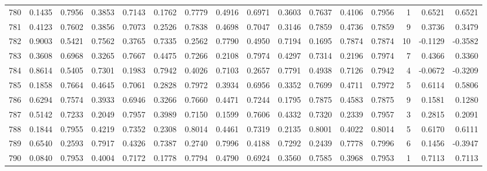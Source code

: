 \begin{tabular}{lrrrrrrrrrrrrrrr}
780 &      0.1435 &  0.7956 &  0.3853 &  0.7143 &  0.1762 &  0.7779 &  0.4916 &  0.6971 &  0.3603 &  0.7637 &   0.4106 &     0.7956 &      1 &                    0.6521 &                     0.6521 \\
781 &      0.4123 &  0.7602 &  0.3856 &  0.7073 &  0.2526 &  0.7838 &  0.4698 &  0.7047 &  0.3146 &  0.7859 &   0.4736 &     0.7859 &      9 &                    0.3736 &                     0.3479 \\
782 &      0.9003 &  0.5421 &  0.7562 &  0.3765 &  0.7335 &  0.2562 &  0.7790 &  0.4950 &  0.7194 &  0.1695 &   0.7874 &     0.7874 &     10 &                   -0.1129 &                    -0.3582 \\
783 &      0.3608 &  0.6968 &  0.3265 &  0.7667 &  0.4475 &  0.7266 &  0.2108 &  0.7974 &  0.4297 &  0.7314 &   0.2196 &     0.7974 &      7 &                    0.4366 &                     0.3360 \\
784 &      0.8614 &  0.5405 &  0.7301 &  0.1983 &  0.7942 &  0.4026 &  0.7103 &  0.2657 &  0.7791 &  0.4938 &   0.7126 &     0.7942 &      4 &                   -0.0672 &                    -0.3209 \\
785 &      0.1858 &  0.7664 &  0.4645 &  0.7061 &  0.2828 &  0.7972 &  0.3934 &  0.6956 &  0.3352 &  0.7699 &   0.4711 &     0.7972 &      5 &                    0.6114 &                     0.5806 \\
786 &      0.6294 &  0.7574 &  0.3933 &  0.6946 &  0.3266 &  0.7660 &  0.4471 &  0.7244 &  0.1795 &  0.7875 &   0.4583 &     0.7875 &      9 &                    0.1581 &                     0.1280 \\
787 &      0.5142 &  0.7233 &  0.2049 &  0.7957 &  0.3989 &  0.7150 &  0.1599 &  0.7606 &  0.4332 &  0.7320 &   0.2339 &     0.7957 &      3 &                    0.2815 &                     0.2091 \\
788 &      0.1844 &  0.7955 &  0.4219 &  0.7352 &  0.2308 &  0.8014 &  0.4461 &  0.7319 &  0.2135 &  0.8001 &   0.4022 &     0.8014 &      5 &                    0.6170 &                     0.6111 \\
789 &      0.6540 &  0.2593 &  0.7917 &  0.4326 &  0.7387 &  0.2740 &  0.7996 &  0.4188 &  0.7292 &  0.2439 &   0.7778 &     0.7996 &      6 &                    0.1456 &                    -0.3947 \\
790 &      0.0840 &  0.7953 &  0.4004 &  0.7172 &  0.1778 &  0.7794 &  0.4790 &  0.6924 &  0.3560 &  0.7585 &   0.3968 &     0.7953 &      1 &                    0.7113 &                     0.7113 \\

\end{tabular}
